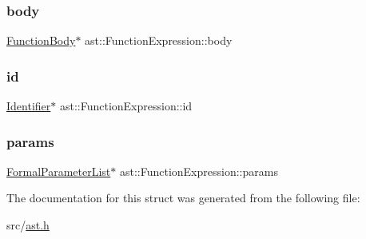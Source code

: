 \subsubsection{\texorpdfstring{body}{body}}
{\footnotesize\ttfamily \hyperlink{structast_1_1_function_body}{Function\+Body}$\ast$ ast\+::\+Function\+Expression\+::body}

\mbox{\label{structast_1_1_function_expression_af3439c30bbde4463bc71158f24b1dd13}} 
\subsubsection{\texorpdfstring{id}{id}}
{\footnotesize\ttfamily \hyperlink{structast_1_1_identifier}{Identifier}$\ast$ ast\+::\+Function\+Expression\+::id}

\mbox{\label{structast_1_1_function_expression_a83a7dd9fe27f5e9f6357f398d52476e3}} 
\subsubsection{\texorpdfstring{params}{params}}
{\footnotesize\ttfamily \hyperlink{structast_1_1_formal_parameter_list}{Formal\+Parameter\+List}$\ast$ ast\+::\+Function\+Expression\+::params}



The documentation for this struct was generated from the following file\+:\begin{DoxyCompactItemize}
\item 
src/\hyperlink{ast_8h}{ast.\+h}\end{DoxyCompactItemize}
